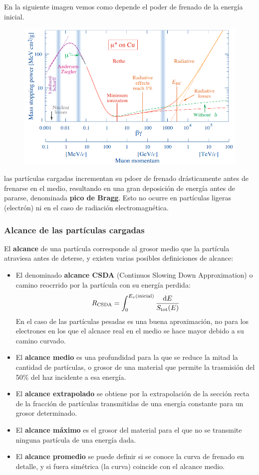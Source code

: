 En la siguiente imagen vemos como depende el poder de frenado de la energía inicial. 

\begin{figure}[H] \centering
    \includegraphics[width=0.7\linewidth]{Cuerpo/Ch_01/Interaccion_01.png}
\end{figure}
las partículas cargadas incrementan su pdoer de frenado drásticamente antes de frenarse en el medio, resultando en una gran deposición de energía antes de pararse, denominada \textbf{pico de Bragg}. Esto no ocurre en partículas ligeras (electrón) ni en el caso de radiación electromagnética. 


\subsubsection{Alcance de las partículas cargadas}


El \textbf{alcance} de una partícula corresponde al grosor medio que la partícula atraviesa antes de deterse, y existen varias posibles definiciones de alcance:

\begin{itemize}
    \item El denominado \textbf{alcance CSDA} (Continuos Slowing Down Approximation) o camino reocrrido por la partícula con su energía perdida: 
    \begin{equation}
        R_{\text{CSDA}} = \int_0^{E_x(\text{inicial})} \frac{\mathrm{d} E}{S_{\text{tot}} (E)}
    \end{equation}
    En el caso de las partículas pesadas es una buena aproximación, no para los electrones en los que el alcnace real en el medio se hace mayor debido a su camino curvado.
    \item El \textbf{alcance medio} es una profundidad para la que se reduce la mitad la cantidad de partículas, o grosor de una material que permite la trasmisión del 50\% del haz incidente a esa energía.
    \item El \textbf{alcance extrapolado} se obtiene por la extrapolación de la sección recta de la fracción de partículas transmitidas de una energía constante para un grosor determinado.
    \item El \textbf{alcance máximo} es el grosor del material para el que no se transmite ninguna partícula de una energía dada.
    \item El \textbf{alcance promedio} se puede definir si se conoce la curva de frenado en detalle, y si fuera simétrica (la curva) coincide con el alcance medio. 
\end{itemize}

